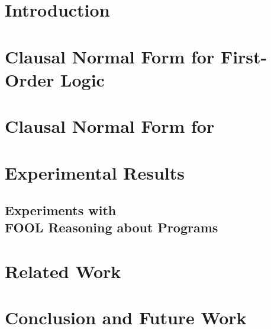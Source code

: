 



\section{Introduction}
\label{sec:newcnf/introduction}


\section{Clausal Normal Form for First-Order Logic}
\label{sec:newcnf/cnf}


\section{Clausal Normal Form for \folb}
\label{sec:newcnf/fool}


\section{Experimental Results}
\label{sec:newcnf/experiments}


\subsection[Experiments with FOOL Reasoning about Programs]{Experiments with\\FOOL Reasoning about Programs}
\label{subsec:PrgAn}


\section{Related Work}
\label{sec:related}


\section{Conclusion and Future Work}
\label{sec:newcnf/conclusions}


